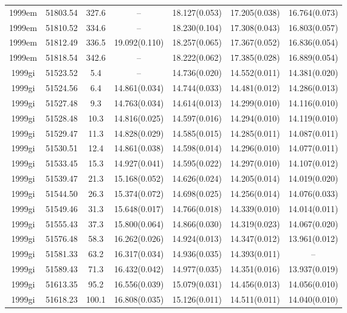 \begin{table*}
\begin{tabular}{ccccccc}
1999em	  & 51803.54	 & 327.6	& --	 & 18.127(0.053)	 & 17.205(0.038)	 & 16.764(0.073) \\ 
1999em	  & 51810.52	 & 334.6	& --	 & 18.230(0.104)	 & 17.308(0.043)	 & 16.803(0.057) \\ 
1999em	  & 51812.49	 & 336.5	& 19.092(0.110)	 & 18.257(0.065)	 & 17.367(0.052)	 & 16.836(0.054) \\ 
1999em	  & 51818.54	 & 342.6	& --	 & 18.222(0.062)	 & 17.385(0.028)	 & 16.889(0.054) \\ 
1999gi	  & 51523.52	 & 5.4	& --	 & 14.736(0.020)	 & 14.552(0.011)	 & 14.381(0.020) \\ 
1999gi	  & 51524.56	 & 6.4	& 14.861(0.034)	 & 14.744(0.033)	 & 14.481(0.012)	 & 14.286(0.013) \\ 
1999gi	  & 51527.48	 & 9.3	& 14.763(0.034)	 & 14.614(0.013)	 & 14.299(0.010)	 & 14.116(0.010) \\ 
1999gi	  & 51528.48	 & 10.3	& 14.816(0.025)	 & 14.597(0.016)	 & 14.294(0.010)	 & 14.119(0.010) \\ 
1999gi	  & 51529.47	 & 11.3	& 14.828(0.029)	 & 14.585(0.015)	 & 14.285(0.011)	 & 14.087(0.011) \\ 
1999gi	  & 51530.51	 & 12.4	& 14.861(0.038)	 & 14.598(0.014)	 & 14.296(0.010)	 & 14.077(0.011) \\ 
1999gi	  & 51533.45	 & 15.3	& 14.927(0.041)	 & 14.595(0.022)	 & 14.297(0.010)	 & 14.107(0.012) \\ 
1999gi	  & 51539.47	 & 21.3	& 15.168(0.052)	 & 14.626(0.024)	 & 14.205(0.014)	 & 14.019(0.020) \\ 
1999gi	  & 51544.50	 & 26.3	& 15.374(0.072)	 & 14.698(0.025)	 & 14.256(0.014)	 & 14.076(0.033) \\ 
1999gi	  & 51549.46	 & 31.3	& 15.648(0.017)	 & 14.766(0.018)	 & 14.339(0.010)	 & 14.014(0.011) \\ 
1999gi	  & 51555.43	 & 37.3	& 15.800(0.064)	 & 14.866(0.030)	 & 14.319(0.023)	 & 14.067(0.020) \\ 
1999gi	  & 51576.48	 & 58.3	& 16.262(0.026)	 & 14.924(0.013)	 & 14.347(0.012)	 & 13.961(0.012) \\ 
1999gi	  & 51581.33	 & 63.2	& 16.317(0.034)	 & 14.936(0.035)	 & 14.393(0.011)	 & -- \\ 
1999gi	  & 51589.43	 & 71.3	& 16.432(0.042)	 & 14.977(0.035)	 & 14.351(0.016)	 & 13.937(0.019) \\ 
1999gi	  & 51613.35	 & 95.2	& 16.556(0.039)	 & 15.079(0.031)	 & 14.456(0.013)	 & 14.056(0.010) \\ 
1999gi	  & 51618.23	 & 100.1	& 16.808(0.035)	 & 15.126(0.011)	 & 14.511(0.011)	 & 14.040(0.010) \\ 

\end{tabular}
\end{table*}
